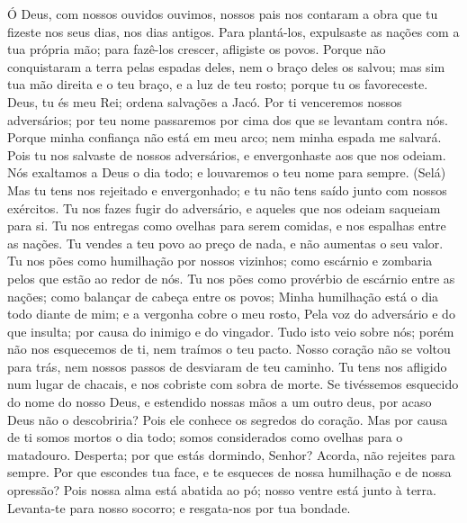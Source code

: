 {\PP 
  Ó Deus, com nossos ouvidos ouvimos, nossos pais nos contaram a obra que tu fizeste nos seus dias, nos dias antigos.
  Para plantá-los, expulsaste as nações com a tua própria mão; para fazê-los crescer, afligiste os povos.
  Porque não conquistaram a terra pelas espadas deles, nem o braço deles os salvou; mas sim tua mão direita e o teu braço, e a luz de teu rosto; porque tu os favoreceste.
  Deus, tu és meu Rei; ordena salvações a Jacó.
  Por ti venceremos nossos adversários; por teu nome passaremos por cima dos que se levantam contra nós.
  Porque minha confiança não está em meu arco; nem minha espada me salvará.
  Pois tu nos salvaste de nossos adversários, e envergonhaste aos que nos odeiam.
  Nós exaltamos a Deus o dia todo; e louvaremos o teu nome para sempre. (Selá)
  Mas
{} tu tens nos rejeitado e envergonhado; e tu não tens saído junto com nossos exércitos.
  Tu nos fazes fugir do adversário, e aqueles que nos odeiam saqueiam
{} para si.
  Tu nos entregas como ovelhas para serem comidas, e nos espalhas entre as nações.
  Tu vendes a teu povo ao preço de nada, e não aumentas o seu valor.
  Tu nos pões como humilhação por nossos vizinhos; como escárnio e zombaria pelos que estão ao redor de nós.
  Tu nos pões como provérbio de escárnio entre as nações; como balançar de cabeça entre os povos;
  Minha humilhação está o dia todo diante de mim; e a vergonha cobre o meu rosto,
  Pela voz do adversário e do que insulta; por causa do inimigo e do vingador.
  Tudo isto veio sobre nós; porém não nos esquecemos de ti, nem traímos o teu pacto.
  Nosso coração não se voltou para trás, nem nossos passos de desviaram de teu caminho.
  Tu tens nos afligido num lugar de chacais, e nos cobriste com sobra de morte.
  Se tivéssemos esquecido do nome do nosso Deus, e estendido nossas mãos a um outro deus,
  por acaso Deus não o descobriria? Pois ele conhece os segredos do coração.
  Mas por causa de ti somos mortos o dia todo; somos considerados como ovelhas para o matadouro.
  Desperta; por que estás dormindo, Senhor? Acorda, não
{} rejeites para sempre.
  Por que escondes tua face, e te esqueces de nossa humilhação e de nossa opressão?
  Pois nossa alma está abatida ao pó; nosso ventre está junto à terra.
  Levanta-te para nosso socorro; e resgata-nos por tua bondade.
\par }

